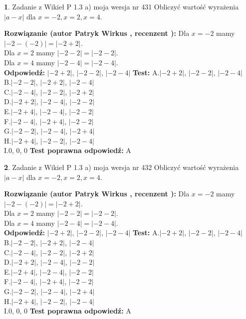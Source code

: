 \documentclass[12pt, a4paper]{article}
\theoremstyle{definition} %
\newtheorem{zad}{}
\newcommand{\zadStart}[1]{\begin{zad}#1\newline}
\newcommand{\zadStop}{\end{zad}}
\newcommand{\rozwStart}[2]{\noindent \textbf{Rozwiązanie (autor #1 , recenzent #2): }\newline}
\newcommand{\rozwStop}{\newline}
\newcommand{\odpStart}{\noindent \textbf{Odpowiedź:}\newline}
\newcommand{\odpStop}{\newline}
\newcommand{\testStart}{\noindent \textbf{Test:}\newline}
\newcommand{\testStop}{\newline}
\newcommand{\kluczStart}{\noindent \textbf{Test poprawna odpowiedź:}\newline}
\newcommand{\kluczStop}{\newline}
\begin{document}
\zadStart{Zadanie z Wikieł P 1.3 a) moja wersja nr 431}
Obliczyć wartość wyrażenia $|a - x|$ dla $x=-2,x=2,x=4$.
\zadStop
\rozwStart{Patryk Wirkus}{}
Dla $x = -2$ mamy $|-2 - (-2)| = |-2 + 2|$.\\
Dla $x = 2$ mamy $|-2 - 2| = |-2 - 2|$.\\
Dla $x = 4$ mamy $|-2 - 4| = |-2 - 4|$.\\
\rozwStop
\odpStart
$|-2 + 2|$, $|-2 - 2|$, $|-2 - 4|$
\odpStop
\testStart
A.$|-2 + 2|$, $|-2 - 2|$, $|-2 - 4|$\\
B.$|-2 - 2|$, $|-2 + 2|$, $|-2 - 4|$\\
C.$|-2 - 4|$, $|-2 - 2|$, $|-2 + 2|$\\
D.$|-2 + 2|$, $|-2 - 4|$, $|-2 - 2|$\\
E.$|-2 + 4|$, $|-2 - 4|$, $|-2 - 2|$\\
F.$|-2 - 4|$, $|-2 + 4|$, $|-2 - 2|$\\
G.$|-2 - 2|$, $|-2 - 4|$, $|-2 + 4|$\\
H.$|-2 + 4|$, $|-2 - 2|$, $|-2 - 4|$\\
I.$0$, $0$, $0$
\testStop
\kluczStart
A
\kluczStop



\zadStart{Zadanie z Wikieł P 1.3 a) moja wersja nr 432}
Obliczyć wartość wyrażenia $|a - x|$ dla $x=-2,x=2,x=4$.
\zadStop
\rozwStart{Patryk Wirkus}{}
Dla $x = -2$ mamy $|-2 - (-2)| = |-2 + 2|$.\\
Dla $x = 2$ mamy $|-2 - 2| = |-2 - 2|$.\\
Dla $x = 4$ mamy $|-2 - 4| = |-2 - 4|$.\\
\rozwStop
\odpStart
$|-2 + 2|$, $|-2 - 2|$, $|-2 - 4|$
\odpStop
\testStart
A.$|-2 + 2|$, $|-2 - 2|$, $|-2 - 4|$\\
B.$|-2 - 2|$, $|-2 + 2|$, $|-2 - 4|$\\
C.$|-2 - 4|$, $|-2 - 2|$, $|-2 + 2|$\\
D.$|-2 + 2|$, $|-2 - 4|$, $|-2 - 2|$\\
E.$|-2 + 4|$, $|-2 - 4|$, $|-2 - 2|$\\
F.$|-2 - 4|$, $|-2 + 4|$, $|-2 - 2|$\\
G.$|-2 - 2|$, $|-2 - 4|$, $|-2 + 4|$\\
H.$|-2 + 4|$, $|-2 - 2|$, $|-2 - 4|$\\
I.$0$, $0$, $0$
\testStop
\kluczStart
A
\kluczStop
\end{document}
